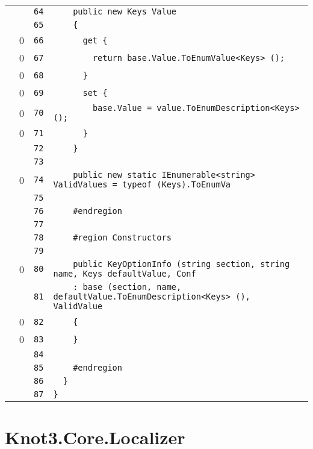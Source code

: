 \documentclass[a4paper,10pt]{article}
\begin{document}
\begin{longtable}[l]{lrrl}
\cellcolor{gray} &  & \verb~64~ & \verb~    public new Keys Value~\\
\cellcolor{gray} &  & \verb~65~ & \verb~    {~\\
\cellcolor{red} & 0 & \verb~66~ & \verb~      get {~\\
\cellcolor{red} & 0 & \verb~67~ & \verb~        return base.Value.ToEnumValue<Keys> ();~\\
\cellcolor{red} & 0 & \verb~68~ & \verb~      }~\\
\cellcolor{red} & 0 & \verb~69~ & \verb~      set {~\\
\cellcolor{red} & 0 & \verb~70~ & \verb~        base.Value = value.ToEnumDescription<Keys> ();~\\
\cellcolor{red} & 0 & \verb~71~ & \verb~      }~\\
\cellcolor{gray} &  & \verb~72~ & \verb~    }~\\
\cellcolor{gray} &  & \verb~73~ & \verb~~\\
\cellcolor{red} & 0 & \verb~74~ & \verb~    public new static IEnumerable<string> ValidValues = typeof (Keys).ToEnumVa~\\
\cellcolor{gray} &  & \verb~75~ & \verb~~\\
\cellcolor{gray} &  & \verb~76~ & \verb~    #endregion~\\
\cellcolor{gray} &  & \verb~77~ & \verb~~\\
\cellcolor{gray} &  & \verb~78~ & \verb~    #region Constructors~\\
\cellcolor{gray} &  & \verb~79~ & \verb~~\\
\cellcolor{red} & 0 & \verb~80~ & \verb~    public KeyOptionInfo (string section, string name, Keys defaultValue, Conf~\\
\cellcolor{gray} &  & \verb~81~ & \verb~    : base (section, name, defaultValue.ToEnumDescription<Keys> (), ValidValue~\\
\cellcolor{red} & 0 & \verb~82~ & \verb~    {~\\
\cellcolor{red} & 0 & \verb~83~ & \verb~    }~\\
\cellcolor{gray} &  & \verb~84~ & \verb~~\\
\cellcolor{gray} &  & \verb~85~ & \verb~    #endregion~\\
\cellcolor{gray} &  & \verb~86~ & \verb~  }~\\
\cellcolor{gray} &  & \verb~87~ & \verb~}~\\
\end{longtable}
\newpage
\section{Knot3.Core.Localizer}
\end{document}
